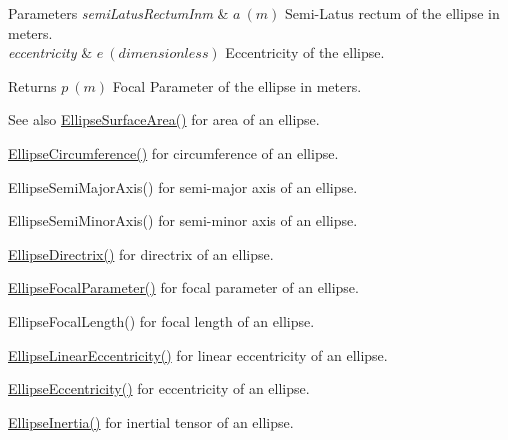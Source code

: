 \begin{DoxyParams}{Parameters}
{\em semi\+Latus\+Rectum\+Inm} & $ a\ (m)$ Semi-\/\+Latus rectum of the ellipse in meters. \\
\hline
{\em eccentricity} & $ e\ (dimensionless)$ Eccentricity of the ellipse. \\
\hline
\end{DoxyParams}
\begin{DoxyReturn}{Returns}
$ p\ (m)$ Focal Parameter of the ellipse in meters. 
\end{DoxyReturn}
\begin{DoxySeeAlso}{See also}
\mbox{\hyperlink{group___e_g_x_math-_geometry-2_d-_ellipse-_surface_area_ga4ce8c8323e9718ce5458f4ab7f6d823d}{Ellipse\+Surface\+Area()}} for area of an ellipse. 

\mbox{\hyperlink{group___e_g_x_math-_geometry-2_d-_ellipse-_circumference_ga4172802ac674eb53467b44928ac635c7}{Ellipse\+Circumference()}} for circumference of an ellipse. 

Ellipse\+Semi\+Major\+Axis() for semi-\/major axis of an ellipse. 

Ellipse\+Semi\+Minor\+Axis() for semi-\/minor axis of an ellipse. 

\mbox{\hyperlink{group___e_g_x_math-_geometry-2_d-_ellipse-_directrix_gace8f72a8efbc9c18d3eb689151405106}{Ellipse\+Directrix()}} for directrix of an ellipse. 

\mbox{\hyperlink{group___e_g_x_math-_geometry-2_d-_ellipse-_focal_parameter_ga4cd01a38c72c092ef9791351948bf69b}{Ellipse\+Focal\+Parameter()}} for focal parameter of an ellipse. 

Ellipse\+Focal\+Length() for focal length of an ellipse. 

\mbox{\hyperlink{group___e_g_x_math-_geometry-2_d-_ellipse-_linear_eccentricity_gac70b3010e30aa8b73deb50fe2b9b9a91}{Ellipse\+Linear\+Eccentricity()}} for linear eccentricity of an ellipse. 

\mbox{\hyperlink{group___e_g_x_math-_geometry-2_d-_ellipse-_eccentricity_ga6a0a7fba17f782616894cfc447628c33}{Ellipse\+Eccentricity()}} for eccentricity of an ellipse. 

\mbox{\hyperlink{group___e_g_x_math-_geometry-2_d-_ellipse-_inertia_ga10a3049c2f04b50f271fb01dc62e4cf8}{Ellipse\+Inertia()}} for inertial tensor of an ellipse. 
\end{DoxySeeAlso}
\mbox{\label{group___e_g_x_math-_geometry-2_d-_ellipse-_focal_parameter_ga406c026954d4f5b357e0310461ed4d1d}} 
